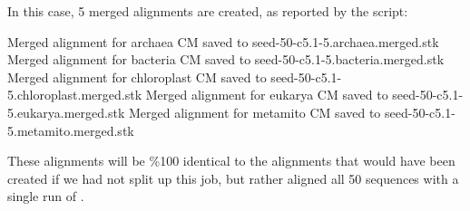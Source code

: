 In this case, 5 merged alignments are created, as reported by the
script:

\begin{sreoutput}
Merged alignment for archaea     CM saved to seed-50-c5.1-5.archaea.merged.stk
Merged alignment for bacteria    CM saved to seed-50-c5.1-5.bacteria.merged.stk
Merged alignment for chloroplast CM saved to seed-50-c5.1-5.chloroplast.merged.stk
Merged alignment for eukarya     CM saved to seed-50-c5.1-5.eukarya.merged.stk
Merged alignment for metamito    CM saved to seed-50-c5.1-5.metamito.merged.stk
\end{sreoutput}

These alignments will be \%100 identical to the alignments that would
have been created if we had not split up this job, but rather aligned
all 50 sequences with a single run of .

